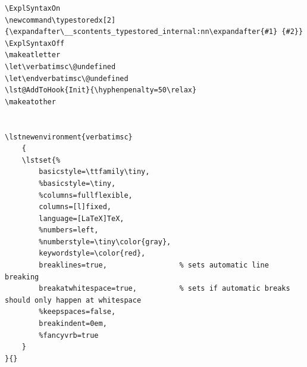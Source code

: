 \begin{lstlisting}[language={[LaTeX]TeX}, caption={Code in the document file to set up the command \textbackslash typestoredx and to configure the listing environment to put the abstract into}, label=lst:setupTypestoreedx] 
\ExplSyntaxOn
\newcommand\typestoredx[2]{\expandafter\__scontents_typestored_internal:nn\expandafter{#1} {#2}}
\ExplSyntaxOff
\makeatletter
\let\verbatimsc\@undefined
\let\endverbatimsc\@undefined
\lst@AddToHook{Init}{\hyphenpenalty=50\relax}
\makeatother


\lstnewenvironment{verbatimsc}
    {
    \lstset{%
        basicstyle=\ttfamily\tiny,
        %basicstyle=\tiny,
        %columns=fullflexible,
        columns=[l]fixed,
        language=[LaTeX]TeX,
        %numbers=left,
        %numberstyle=\tiny\color{gray},
        keywordstyle=\color{red},
        breaklines=true,                 % sets automatic line breaking
        breakatwhitespace=true,          % sets if automatic breaks should only happen at whitespace
        %keepspaces=false,
        breakindent=0em,
        %fancyvrb=true
    }
}{}
\end{lstlisting}
\clearpage


